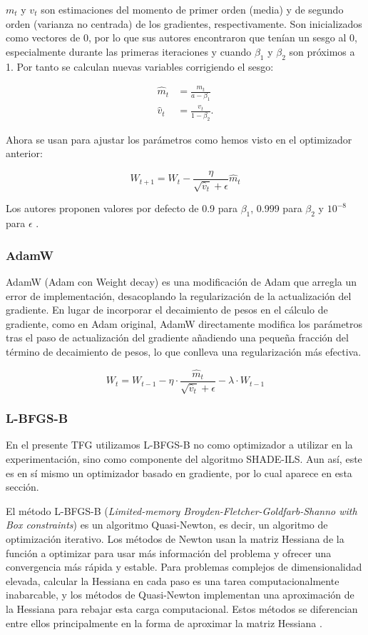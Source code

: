 $m_t$ y $v_t$ son estimaciones del momento de primer orden (media) y de segundo orden (varianza no centrada) de los gradientes, respectivamente. Son inicializados como vectores de 0, por lo que sus autores encontraron que tenían un sesgo al 0, especialmente durante las primeras iteraciones y cuando $\beta_1$ y $\beta_2$ son próximos a 1. Por tanto se calculan nuevas variables corrigiendo el sesgo:

\begin{align*}
	\hat{m}_t&=\frac{m_t}{a-\beta_1}\\
	\hat{v}_t&=\frac{v_t}{1-\beta_2}.
\end{align*}

Ahora se usan para ajustar los parámetros como hemos visto en el optimizador anterior:

$$W_{t+1} = W_t - \frac{\eta}{\sqrt{\hat{v}_t} + \epsilon} \hat{m}_t$$

Los autores proponen valores por defecto de 0.9 para $\beta_1$, 0.999 para $\beta_2$ y $10^{-8}$ para $\epsilon$ \cite{divedeeplearning, GoodFellowBook}.

\subsubsection{AdamW}

AdamW (Adam con Weight decay) \cite{AdamW} es una modificación de Adam que arregla un error de implementación, desacoplando la regularización de la actualización del gradiente. En lugar de incorporar el decaimiento de pesos en el cálculo de gradiente, como en Adam original, AdamW directamente modifica los parámetros tras el paso de actualización del gradiente añadiendo una pequeña fracción del término de decaimiento de pesos, lo que conlleva una regularización más efectiva.


$$W_t = W_{t-1} - \eta \cdot \frac{\hat{m}_t}{\sqrt{\hat{v}_t} + \epsilon} - \lambda \cdot W_{t-1}$$

\subsubsection{L-BFGS-B}\label{sec:l-bfgs}


En el presente TFG utilizamos L-BFGS-B no como optimizador a utilizar en la experimentación, sino como componente del algoritmo SHADE-ILS. Aun así, este es en sí mismo un optimizador basado en gradiente, por lo cual aparece en esta sección.

El método L-BFGS-B (\textit{Limited-memory Broyden-Fletcher-Goldfarb-Shanno with Box constraints}) \cite{L-BFGS-B} es un algoritmo Quasi-Newton, es decir, un algoritmo de optimización iterativo. Los métodos de Newton usan la matriz Hessiana de la función a optimizar para usar más información del problema y ofrecer una convergencia más rápida y estable. Para problemas complejos de  dimensionalidad elevada, calcular la Hessiana en cada paso es una tarea computacionalmente inabarcable, y los métodos de Quasi-Newton implementan una aproximación de la Hessiana para rebajar esta carga computacional. Estos métodos se diferencian entre ellos principalmente en la forma de aproximar la matriz Hessiana \cite{Numerical_optimization}.


